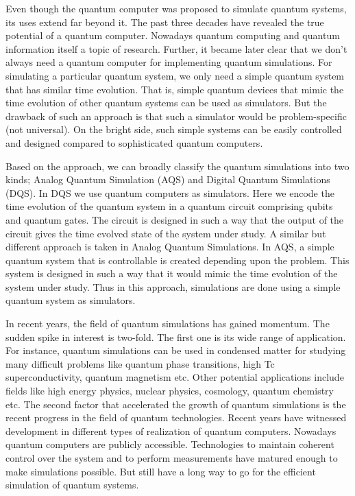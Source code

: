 \documentclass[12pt,a4paper]{report}
\begin{document}
Even though the quantum computer was proposed to simulate quantum systems, its uses extend far beyond it. The past three decades have revealed the true potential of a quantum computer. Nowadays quantum computing and quantum information itself a topic of research. Further, it became later clear that we don’t always need a quantum computer for implementing quantum simulations. For simulating a particular quantum system, we only need a simple quantum system that has similar time evolution. That is, simple quantum devices that mimic the time evolution of other quantum systems can be used as simulators. But the drawback of such an approach is that such a simulator would be problem-specific (not universal). On the bright side, such simple systems can be easily controlled and designed compared to sophisticated quantum computers.

Based on the approach, we can broadly classify the quantum simulations into two kinds; Analog Quantum Simulation (AQS) and Digital Quantum Simulations (DQS). In DQS we use quantum computers as simulators. Here we encode the time evolution of the quantum system in a quantum circuit comprising qubits and quantum gates.  The circuit is designed in such a way that the output of the circuit gives the time evolved state of the system under study.  A similar but different approach is taken in Analog Quantum Simulations. In AQS, a simple quantum system that is controllable is created depending upon the problem. This system is designed in such a way that it would mimic the time evolution of the system under study. Thus in this approach, simulations are done using a simple quantum system as simulators.

In recent years, the field of quantum simulations has gained momentum. The sudden spike in interest is two-fold. The first one is its wide range of application. For instance, quantum simulations can be used in condensed matter for studying many difficult problems like quantum phase transitions, high Tc superconductivity, quantum magnetism etc. Other potential applications include fields like high energy physics, nuclear physics, cosmology, quantum chemistry etc. The second factor that accelerated the growth of quantum simulations is the recent progress in the field of quantum technologies. Recent years have witnessed development in different types of realization of quantum computers. Nowadays quantum computers are publicly accessible. %
Technologies to maintain coherent control over the system and to perform measurements have matured enough to make simulations possible. But still have a long way to go for the efficient simulation of quantum systems.
\end{document}
